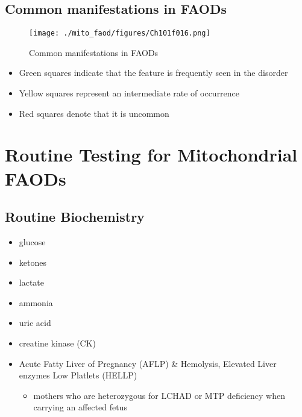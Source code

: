 \documentclass{scrartcl}
\begin{document}
\subsection{Common manifestations in FAODs}
\label{sec:orgc649c95}
\begin{figure}[htbp]
\centering
\texttt{[image: ./mito\_faod/figures/Ch101f016.png]}
\caption{\label{fig:org0dd5a2c}
Common manifestations in FAODs}
\end{figure}

\begin{itemize}
\item Green squares indicate that the feature is frequently seen in the disorder
\item Yellow squares represent an intermediate rate of occurrence
\item Red squares denote that it is uncommon
\end{itemize}

\section{Routine Testing for Mitochondrial FAODs}
\label{sec:org56e48c3}
\subsection{Routine Biochemistry}
\label{sec:orgfa24849}
\begin{itemize}
\item glucose
\item ketones
\item lactate
\item ammonia
\item uric acid
\item creatine kinase (CK)
\item Acute Fatty Liver of Pregnancy (AFLP) \& Hemolysis, Elevated Liver enzymes Low Platlets (HELLP)
\begin{itemize}
\item mothers who are heterozygous for LCHAD or MTP deficiency when
carrying an affected fetus
\end{itemize}
\end{itemize}
\end{document}
